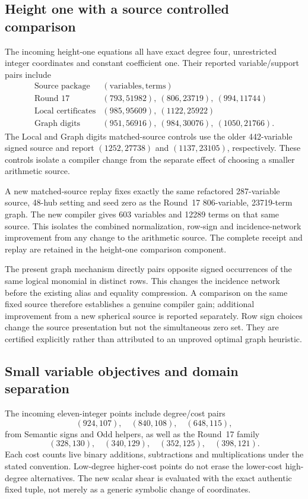 \subsection{Height one with a source controlled comparison}
The incoming height-one equations all have exact degree four, unrestricted
integer coordinates and constant coefficient one. Their reported
variable/support pairs include
\[
\begin{array}{c|l}
\text{Source package}&(\text{variables},\text{terms})\\\hline
\text{Round 17}&(793,51982),\ (806,23719),\ (994,11744)\\
\text{Local certificates}&(985,95609),\ (1122,25922)\\
\text{Graph digits}&(951,56916),\ (984,30076),\ (1050,21766).
\end{array}
\]
The Local and Graph digits matched-source controls use the older
442-variable signed source and report $(1252,27738)$ and $(1137,23105)$,
respectively. These controls isolate a compiler change from the separate
effect of choosing a smaller arithmetic source.

A new matched-source replay fixes exactly the same refactored 287-variable
source, 48-hub setting and seed zero as the Round~17 806-variable,
23719-term graph. The new compiler gives 603 variables and 12289 terms
on that same source. This isolates the combined normalization, row-sign
and incidence-network improvement from any change to the arithmetic source.
The complete receipt and replay are retained in the height-one comparison
component.

The present graph mechanism directly pairs opposite signed occurrences
of the same logical monomial in distinct rows. This changes the incidence
network before the existing alias and equality compression. A comparison
on the same fixed source therefore establishes a genuine compiler gain;
additional improvement from a new spherical source is reported separately.
Row sign choices change the source presentation but not the simultaneous
zero set. They are certified explicitly rather than attributed to an
unproved optimal graph heuristic.

\subsection{Small variable objectives and domain separation}
The incoming eleven-integer points include degree/cost pairs
\[
 (924,107),\quad(840,108),\quad(648,115),
\]
from Semantic signs and Odd helpers, as well as the Round~17 family
\[
 (328,130),\quad(340,129),\quad(352,125),\quad(398,121).
\]
Each cost counts live binary additions, subtractions and multiplications
under the stated convention. Low-degree higher-cost points do not erase
the lower-cost high-degree alternatives. The new scalar shear is evaluated
with the exact authentic fixed tuple, not merely as a generic symbolic
change of coordinates.

